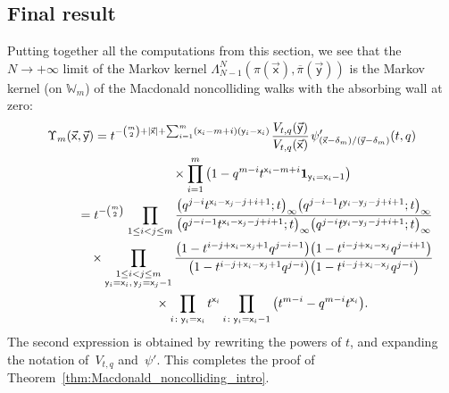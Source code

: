 \documentclass[pdftex]{sigma}
\numberwithin{equation}{section}
\begin{document}
\subsection{Final result}

Putting together all the computations from this section, we see that the
$N\to+\infty$ limit of the Markov kernel $\Lambda^{N}_{N-1}(\pi(\vec{\mathsf{x}}),
\overline\pi(\vec{\mathsf{y}}))$ is the Markov kernel (on $\mathbb{W}_m$)
of the Macdonald noncolliding walks with the absorbing wall at zero:
\begin{gather}
	\nonumber
	\Upsilon_m(\vec{\mathsf{x}},\vec{\mathsf{y}}) =
	t^{-\binom m2+|\vec{\mathsf{x}}|
	+\sum_{i=1}^{m}
	(\mathsf{x}_{i}-m+i)(\mathsf{y}_{i}-\mathsf{x}_{i})}	
	\hspace{1pt}
	\frac{V_{t,q}(\vec{\mathsf{y}})}{V_{t,q}(\vec{\mathsf{x}})}
	\hspace{1pt}
	\psi'_{(\vec{\mathsf{x}}-\delta_m)/(\vec{\mathsf{y}}-\delta_m)}(t,q)
	\\
\hphantom{\Upsilon_m(\vec{\mathsf{x}},\vec{\mathsf{y}})=}{}	
\times
	\prod_{i=1}^{m}
	\big( 1-q^{m-i}t^{\mathsf{x}_i-m+i}\mathbf{1}_{\mathsf{y}_i=\mathsf{x}_i-1}\big)\nonumber
	\\
	\nonumber
\hphantom{\Upsilon_m(\vec{\mathsf{x}},\vec{\mathsf{y}})}{}	
=
	t^{-\binom m2}	
	\hspace{1pt}
	\prod_{1\le i<j\le m}
	\frac
	{
		\big(q^{j-i} t^{\mathsf{x}_i-\mathsf{x}_j-j+i+1};t\big)_{\infty}
		\big( q^{j-i-1}t^{\mathsf{y}_i-\mathsf{y}_j-j+i+1};t \big)_{\infty}
	}
	{
		\big( q^{j-i-1}t^{\mathsf{x}_i-\mathsf{x}_j-j+i+1};t \big)_{\infty}
		\big(q^{j-i} t^{\mathsf{y}_i-\mathsf{y}_j-j+i+1};t\big)_{\infty}
	}
	\\
\hphantom{\Upsilon_m(\vec{\mathsf{x}},\vec{\mathsf{y}})=}{}	\times
\nonumber
	\prod_{\substack{1\le i<j\le m
	\\
	\mathsf{y}_{i}=\mathsf{x}_{i}
	,\,
	\mathsf{y}_{j}=\mathsf{x}_{j}-1}}
	\frac{\big(1-t^{i-j+\mathsf{x}_{i}-\mathsf{x}_{j}+1}
	q^{j-i-1}\big)
	\big(1-t^{i-j+\mathsf{x}_{i}-\mathsf{x}_{j}} q^{j-i+1}\big)}
	{\big(1-t^{i-j+\mathsf{x}_{i}-\mathsf{x}_{j}+1} q^{j-i}\big)
	\big(1-t^{i-j+\mathsf{x}_{i}-\mathsf{x}_{j}} q^{j-i}\big)}
	\\
\hphantom{\Upsilon_m(\vec{\mathsf{x}},\vec{\mathsf{y}})=}{}	\times
	\prod_{i\colon \mathsf{y}_i=\mathsf{x}_i}
	t^{\mathsf{x}_i}
	\prod_{i\colon \mathsf{y}_i=\mathsf{x}_i-1}
	\big(t^{m-i}-q^{m-i}t^{\mathsf{x}_i}\big)
	.\label{eq:Upsilon_final_formula}
\end{gather}
The second expression is obtained by rewriting the
powers of $t$, and expanding the notation of~$V_{t,q}$ and~$\psi'$.
This completes the proof of Theorem~\ref{thm:Macdonald_noncolliding_intro}.
\end{document}
